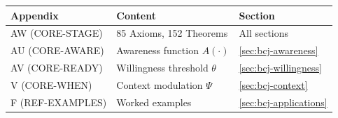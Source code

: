 \begin{tcolorbox}[
    colback=yellow!10!white,
    colframe=orange!75!black,
    title={\textbf{Appendix References for This Chapter}},
    fonttitle=\bfseries
]
\begin{tabular}{lll}
\textbf{Appendix} & \textbf{Content} & \textbf{Section} \\
\midrule
AW (CORE-STAGE) & 85 Axioms, 152 Theorems & All sections \\
AU (CORE-AWARE) & Awareness function $A(\cdot)$ & \ref{sec:bcj-awareness} \\
AV (CORE-READY) & Willingness threshold $\theta$ & \ref{sec:bcj-willingness} \\
V (CORE-WHEN) & Context modulation $\Psi$ & \ref{sec:bcj-context} \\
F (REF-EXAMPLES) & Worked examples & \ref{sec:bcj-applications}
\end{tabular}
\end{tcolorbox}

